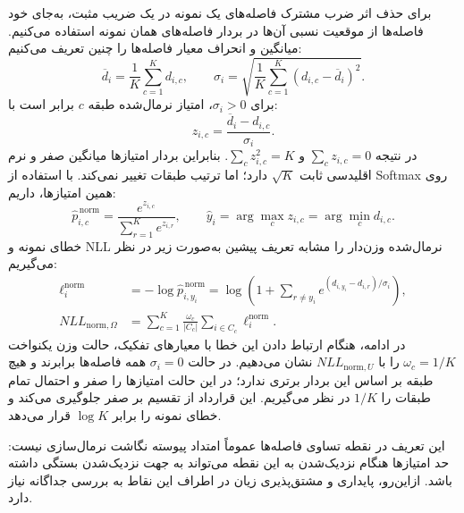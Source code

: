 برای حذف اثر ضرب مشترک فاصله‌های یک نمونه در یک ضریب مثبت، به‌جای خود فاصله‌ها از موقعیت نسبی آن‌ها در بردار فاصله‌های همان نمونه استفاده می‌کنیم. میانگین و انحراف معیار فاصله‌ها را چنین تعریف می‌کنیم:
\begin{equation}\label{eq:ch3-distance-statistics}
\overline d_i=\frac1K\sum_{c=1}^{K}d_{i,c},
\qquad
\sigma_i=\sqrt{\frac1K\sum_{c=1}^{K}
(d_{i,c}-\overline d_i)^2}.
\end{equation}
برای $\sigma_i>0$، امتیاز نرمال‌شده طبقه $c$ برابر است با:
\begin{equation}\label{eq:ch3-normalized-score}
\boxed{z_{i,c}=\frac{\overline d_i-d_{i,c}}{\sigma_i}.}
\end{equation}
در نتیجه $\sum_cz_{i,c}=0$ و $\sum_cz_{i,c}^2=K$. بنابراین بردار امتیازها میانگین صفر و نرم اقلیدسی ثابت $\sqrt K$ دارد؛ اما ترتیب طبقات تغییر نمی‌کند. با استفاده از Softmax روی همین امتیازها، داریم:
\begin{equation}\label{eq:ch3-normalized-softmax}
\widehat p_{i,c}^{\,\mathrm{norm}}
=\frac{e^{z_{i,c}}}{\sum_{r=1}^{K}e^{z_{i,r}}},
\qquad
\widehat y_i=\arg\max_c z_{i,c}=\arg\min_c d_{i,c}.
\end{equation}
خطای نمونه و NLL نرمال‌شده وزن‌دار را مشابه تعریف پیشین به‌صورت زیر در نظر می‌گیریم:
\begin{equation}\label{eq:ch3-normalized-NLL}
\boxed{
\begin{aligned}
\ell_i^{\mathrm{norm}}
&=-\log\widehat p_{i,y_i}^{\,\mathrm{norm}}
=\log\left(1+\sum_{r\ne y_i}
e^{(d_{i,y_i}-d_{i,r})/\sigma_i}\right),\\
NLL_{\mathrm{norm},\Omega}
&=\sum_{c=1}^{K}\frac{\omega_c}{|C_c|}
\sum_{i\in C_c}\ell_i^{\mathrm{norm}}.
\end{aligned}}
\end{equation}
در ادامه، هنگام ارتباط دادن این خطا با معیارهای تفکیک، حالت وزن یکنواخت $\omega_c=1/K$ را با $NLL_{\mathrm{norm},U}$ نشان می‌دهیم.
در حالت $\sigma_i=0$ همه فاصله‌ها برابرند و هیچ طبقه بر اساس این بردار برتری ندارد؛ در این حالت امتیازها را صفر و احتمال تمام طبقات را $1/K$ در نظر می‌گیریم. این قرارداد از تقسیم بر صفر جلوگیری می‌کند و خطای نمونه را برابر $\log K$ قرار می‌دهد.

این تعریف در نقطه تساوی فاصله‌ها عموماً
امتداد پیوسته نگاشت نرمال‌سازی نیست:
حد امتیازها هنگام نزدیک‌شدن به این نقطه
می‌تواند به جهت نزدیک‌شدن بستگی داشته باشد.
ازاین‌رو، پایداری و مشتق‌پذیری زیان
در اطراف این نقاط به بررسی جداگانه نیاز دارد.



